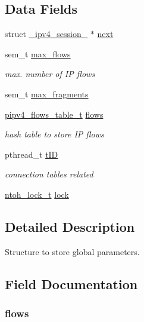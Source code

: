 \subsection*{Data Fields}
\begin{DoxyCompactItemize}
\item 
struct \hyperlink{struct__ipv4__session__}{\-\_\-ipv4\-\_\-session\-\_\-} $\ast$ \hyperlink{struct__ipv4__session___ad26a99e8003a094ea95493f8b3a22bea}{next}
\item 
sem\-\_\-t \hyperlink{struct__ipv4__session___aba31d11fb16b2f989c42f6433365649e}{max\-\_\-flows}
\begin{DoxyCompactList}\small\item\em max. number of I\-P flows \end{DoxyCompactList}\item 
sem\-\_\-t \hyperlink{struct__ipv4__session___a122dd84b8082b78785803252948a6ad0}{max\-\_\-fragments}
\item 
\hyperlink{ipv4defrag_8h_a7717152886e2f9d1d86e4f28306a5140}{pipv4\-\_\-flows\-\_\-table\-\_\-t} \hyperlink{struct__ipv4__session___ac6eb96500101a7e5b82c6cbdd6e4d12c}{flows}
\begin{DoxyCompactList}\small\item\em hash table to store I\-P flows \end{DoxyCompactList}\item 
pthread\-\_\-t \hyperlink{struct__ipv4__session___ab10186c154259d2b4ed2d25b7e23ed17}{t\-I\-D}
\begin{DoxyCompactList}\small\item\em connection tables related \end{DoxyCompactList}\item 
\hyperlink{structntoh__lock__t}{ntoh\-\_\-lock\-\_\-t} \hyperlink{struct__ipv4__session___aad15823e4f2835531e6a02321cd53f7e}{lock}
\end{DoxyCompactItemize}


\subsection{Detailed Description}
Structure to store global parameters. 

\subsection{Field Documentation}
\hypertarget{struct__ipv4__session___ac6eb96500101a7e5b82c6cbdd6e4d12c}{
\subsubsection[{flows}]{ flows}}\label{struct__ipv4__session___ac6eb96500101a7e5b82c6cbdd6e4d12c}


